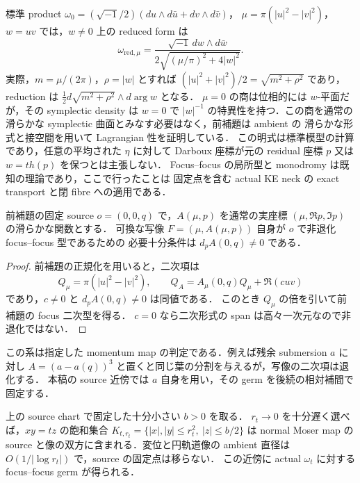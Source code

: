\begin{remark}
標準 product
$\omega_0=(\sqrt{-1}/2)(du\wedge d\bar u+dv\wedge d\bar v)$，
$\mu=\pi(|u|^2-|v|^2)$，$w=uv$ では，$w\ne0$ 上の reduced form は
\[
 \omega_{\mathrm{red},\mu}
 =\frac{\sqrt{-1}\,dw\wedge d\bar w}
        {2\sqrt{(\mu/\pi)^2+4|w|^2}}.
\]
実際，$m=\mu/(2\pi)$，$\rho=|w|$ とすれば
$(|u|^2+|v|^2)/2=\sqrt{m^2+\rho^2}$ であり，
reduction は $\frac12 d\sqrt{m^2+\rho^2}\wedge d\arg w$ となる．
$\mu=0$ の商は位相的には $w$-平面だが，その symplectic density は
$w=0$ で $|w|^{-1}$ の特異性を持つ．この商を通常の滑らかな
symplectic 曲面とみなす必要はなく，前補題は ambient の
滑らかな形式と接空間を用いて Lagrangian 性を証明している．
この明式は標準模型の計算であり，任意の平均された $\eta$ に対して
Darboux 座標が元の residual 座標 $p$ 又は $w=t h(p)$ を保つとは主張しない．
Focus--focus の局所型と monodromy は既知の理論であり，ここで行ったことは
固定点を含む actual KE neck の exact transport と閉 fibre への適用である．
\end{remark}

\begin{corollary}
\label{ke:source-focus-transversality}
前補題の固定 source $o=(0,0,q)$ で，$A(\mu,p)$ を通常の実座標
$(\mu,\Re p,\Im p)$ の滑らかな関数とする．
可換な写像 $F=(\mu,A(\mu,p))$ 自身が $o$ で非退化 focus--focus 型であるための
必要十分条件は $d_pA(0,q)\ne0$ である．
\end{corollary}
\begin{proof}
前補題の正規化を用いると，二次項は
\[
 Q_\mu=\pi(|u|^2-|v|^2),\qquad
 Q_A=A_\mu(0,q)Q_\mu+\Re(cuv)
\]
であり，$c\ne0$ と $d_pA(0,q)\ne0$ は同値である．
このとき $Q_\mu$ の倍を引いて前補題の focus 二次型を得る．
$c=0$ なら二次形式の span は高々一次元なので非退化ではない．
\end{proof}

この系は指定した momentum map の判定である．例えば残余 submersion $a$ に対し
$A=(a-a(q))^3$ と置くと同じ葉の分割を与えるが，写像の二次項は退化する．
本稿の source 近傍では $a$ 自身を用い，その germ を後続の相対補間で固定する．

\begin{corollary}
\label{ke:source-diagonal-moser}
上の source chart で固定した十分小さい $b>0$ を取る．
$r_t\to0$ を十分遅く選べば，$xy=tz$ の飽和集合
$K_{t,r_t}=\{|x|,|y|\le r_t^2,\ |z|\le b/2\}$ は
normal Moser map の source と像の双方に含まれる．変位と円軌道像の
ambient 直径は $O(1/|\log r_t|)$ で，source の固定点は移らない．
この近傍に actual $\omega_t$ に対する focus--focus germ が得られる．
\end{corollary}

